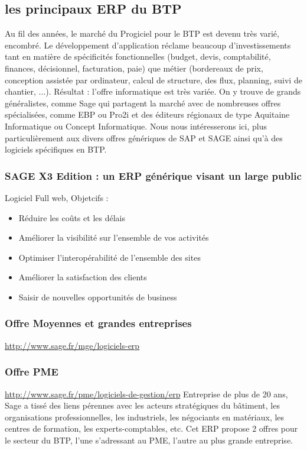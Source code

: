 		\subsection{les principaux ERP du BTP}
		Au fil des années, le marché du Progiciel pour le BTP est devenu très varié, encombré. 
Le développement d'application réclame beaucoup d'investissements tant en matière de spécificités fonctionnelles (budget, devis, comptabilité, finances, décisionnel, facturation, paie) que métier (bordereaux de prix, conception assistée par ordinateur, calcul de structure, des flux, planning, suivi de chantier, ...). 
Résultat : l'offre informatique est très variée. On y trouve de grands généralistes, comme Sage qui partagent la marché avec de nombreuses offres spécialisées, comme EBP ou Pro2i et des éditeurs régionaux de type Aquitaine Informatique ou Concept Informatique.
Nous nous intéresserons ici, plus particulièrement aux divers offres génériques de SAP et SAGE ainsi qu'à des logiciels spécifiques en BTP.
				\subsubsection{SAGE X3 Edition : un ERP générique visant un large public}
						Logiciel Full web,
						Objetcifs :
						\begin{itemize}
						    \item Réduire les coûts et les délais
						    \item Améliorer la visibilité sur l'ensemble de vos activités
							\item Optimiser l'interopérabilité de l'ensemble des sites
						    \item Améliorer la satisfaction des clients
							\item Saisir de nouvelles opportunités de business
						\end{itemize}

						\subsubsection{Offre Moyennes et grandes entreprises}
								\url{http://www.sage.fr/mge/logiciels-erp}
								\subsubsection{Offre PME}
								\url{http://www.sage.fr/pme/logiciels-de-gestion/erp}
						Entreprise de plus de 20 ans, Sage a tissé des liens pérennes avec les acteurs stratégiques du bâtiment, les organisations professionnelles, les industriels, 
            les négociants en matériaux, les centres de formation, les experts-comptables, etc. 
Cet ERP propose 2 offres pour le secteur du BTP, l'une s'adressant au PME, l'autre au plus grande entreprise.

